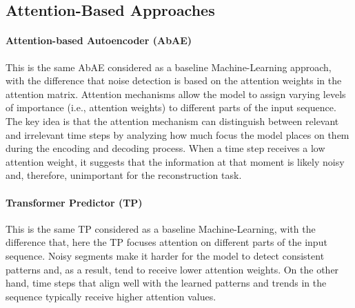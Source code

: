 \documentclass[conference]{IEEEtran}
\begin{document}
\subsection{Attention-Based Approaches}

\paragraph{Attention-based Autoencoder (AbAE)} This is the same AbAE considered as a baseline Machine-Learning approach, with the difference that noise detection is based on the attention weights in the attention matrix. Attention mechanisms allow the model to assign varying levels of importance (i.e., attention weights) to different parts of the input sequence. The key idea is that the attention mechanism can distinguish between relevant and irrelevant time steps by analyzing how much focus the model places on them during the encoding and decoding process. When a time step receives a low attention weight, it suggests that the information at that moment is likely noisy and, therefore, unimportant for the reconstruction task.

\paragraph{Transformer Predictor (TP)} This is the same TP considered as a baseline Machine-Learning, with the difference that, here the TP focuses attention on different parts of the input sequence. Noisy segments make it harder for the model to detect consistent patterns and, as a result, tend to receive lower attention weights. On the other hand, time steps that align well with the learned patterns and trends in the sequence typically receive higher attention values.

\end{document}
